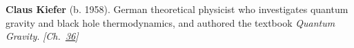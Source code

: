 \textbf{Claus Kiefer} (b. 1958). German theoretical physicist who investigates quantum gravity and black hole thermodynamics, and authored the textbook \emph{Quantum Gravity}. \emph{[Ch.~\hyperref[ch:qftvsgr]{36}]}

